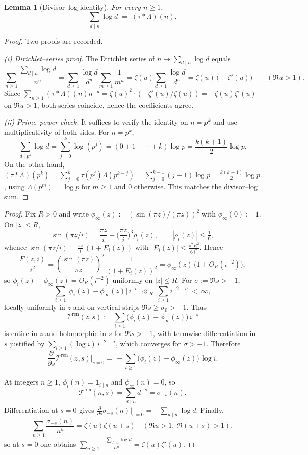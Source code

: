 \documentclass[11pt,a4paper]{amsart}
\theoremstyle{plain}
\newtheorem{lemma}[theorem]{Lemma}
\theoremstyle{definition}
\theoremstyle{remark}
\begin{document}
\begin{lemma}[Divisor–log identity]\label{lem:divlog}
For every $n\ge1$,
\[
\sum_{d\mid n}\log d \;=\; (\tau*\Lambda)(n).
\]
\end{lemma}
\begin{proof}
Two proofs are recorded.

\emph{(i) Dirichlet–series proof.} The Dirichlet series of $n\mapsto \sum_{d\mid n}\log d$ equals
\[
\sum_{n\ge1}\frac{\sum_{d\mid n}\log d}{n^u}
=\sum_{d\ge1}\frac{\log d}{d^{u}}\sum_{m\ge1}\frac{1}{m^{u}}
=\zeta(u)\sum_{d\ge1}\frac{\log d}{d^{u}}
=\zeta(u)\,\bigl(-\zeta'(u)\bigr)\qquad(\Re u>1).
\]
Since $\sum_{n\ge1}(\tau*\Lambda)(n)n^{-u}=\zeta(u)^2\cdot(-\zeta'(u)/\zeta(u))=-\zeta(u)\zeta'(u)$ on $\Re u>1$, both series coincide, hence the coefficients agree.

\emph{(ii) Prime–power check.} It suffices to verify the identity on $n=p^k$ and use multiplicativity of both sides. For $n=p^k$,
\[
\sum_{d\mid p^k}\log d=\sum_{j=0}^{k}\log(p^j)=(0+1+\cdots+k)\log p=\frac{k(k+1)}{2}\log p.
\]
On the other hand, $(\tau*\Lambda)(p^k)=\sum_{j=0}^k \tau(p^j)\Lambda(p^{k-j})=\sum_{j=0}^{k-1}(j+1)\log p=\frac{k(k+1)}{2}\log p$, using $\Lambda(p^m)=\log p$ for $m\ge1$ and $0$ otherwise. This matches the divisor–log sum.
\end{proof}

\begin{proof}
Fix $R>0$ and write $\phi_\infty(z):=(\sin(\pi z)/(\pi z))^2$ with $\phi_\infty(0):=1$. On $|z|\le R$,
\[
\sin(\pi z/i)=\frac{\pi z}{i}+\Big(\frac{\pi z}{i}\Big)^3 \rho_i(z),\qquad |\rho_i(z)|\le \tfrac{1}{6},
\]
whence $\sin(\pi z/i)=\frac{\pi z}{i}\,(1+E_i(z))$ with $|E_i(z)|\le \frac{\pi^2 R^2}{6\,i^{2}}$. Hence
\[
\frac{F(z,i)}{i^2}
=\left(\frac{\sin(\pi z)}{\pi z}\right)^{\!2}\,\frac{1}{(1+E_i(z))^{2}}
=\phi_\infty(z)\,\big(1+O_R(i^{-2})\big),
\]
so $\phi_i(z)-\phi_\infty(z)=O_R(i^{-2})$ uniformly on $|z|\le R$. For $\sigma:=\Re s>-1$,
\[
\sum_{i\ge1}\big|\phi_i(z)-\phi_\infty(z)\big|\,i^{-\sigma}\ \ll_R\ \sum_{i\ge1}i^{-2-\sigma}\ <\ \infty,
\]
locally uniformly in $z$ and on vertical strips $\Re s\ge \sigma_0>-1$. Thus
\[
\mathcal T^{\mathrm{ren}}(z,s):=\sum_{i\ge1}\big(\phi_i(z)-\phi_\infty(z)\big)\,i^{-s}
\]
is entire in $z$ and holomorphic in $s$ for $\Re s>-1$, with termwise differentiation in $s$ justified by $\sum_{i\ge1}(\log i)\,i^{-2-\sigma}$, which converges for $\sigma>-1$. Therefore
\[
\frac{\partial}{\partial s}\mathcal T^{\mathrm{ren}}(z,s)\Big|_{s=0}
=\,-\sum_{i\ge1}\bigl(\phi_i(z)-\phi_\infty(z)\bigr)\,\log i.
\]

At integers $n\ge1$, $\phi_i(n)=\mathbf 1_{i\mid n}$ and $\phi_\infty(n)=0$, so
\[
\mathcal T^{\mathrm{ren}}(n,s)=\sum_{d\mid n}d^{-s}=\sigma_{-s}(n).
\]
Differentiation at $s=0$ gives $\frac{\partial}{\partial s}\sigma_{-s}(n)|_{s=0}=-\sum_{d\mid n}\log d$. Finally,
\[
\sum_{n\ge1}\frac{\sigma_{-s}(n)}{n^u}=\zeta(u)\zeta(u+s)
\quad(\Re u>1,\ \Re(u+s)>1),
\]
so at $s=0$ one obtains $\sum_{n\ge1}\frac{-\sum_{d\mid n}\log d}{n^u}=\zeta(u)\zeta'(u)$.
\end{proof}
\end{document}
